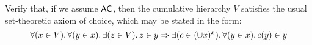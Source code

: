 \begin{ex}
Verify that, if we assume $\mathsf{AC}_{}$, then the cumulative hierarchy $V$ satisfies the usual set-theoretic axiom of choice, which may be stated in the form:
  \[
   \fall{x\in V} \fall{y\in x}\exis{z\in V} z\in y \Rightarrow  \exis{c\in(\cup x)^x}\fall{y\in x} c(y)\in y
   \]
\end{ex}

%

